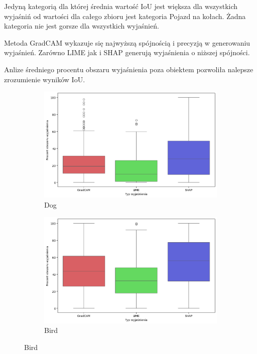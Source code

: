 Jedyną kategorią dla której średnia wartość IoU jest większa dla wszystkich wyjaśniń od wartości dla całego zbioru jest kategoria Pojazd na kołach.
Żadna kategoria nie jest gorsze dla wszystkich wyjaśnień.

Metoda GradCAM wykazuje się najwyższą spójnością i precyzją w generowaniu wyjaśnień.
Zarówno LIME jak i SHAP generują wyjaśnienia o niższej spójności.

\vspace{1cm}

Anlize średniego procentu obszaru wyjaśnienia poza obiektem pozwoliła nalepsze zrozumienie wyników IoU.

\begin{figure}[h]
	\centering
	\begin{subfigure}[b]{0.3\textwidth}
		\centering\includegraphics[width=.9\textwidth]{img/areaincorrect_dog}
		\caption{Dog}
	\end{subfigure}
	\begin{subfigure}[b]{0.3\textwidth}
		\centering\includegraphics[width=.9\textwidth]{img/areaincorrect_bird}
		\caption{Bird}
	\end{subfigure}

\end{figure}

